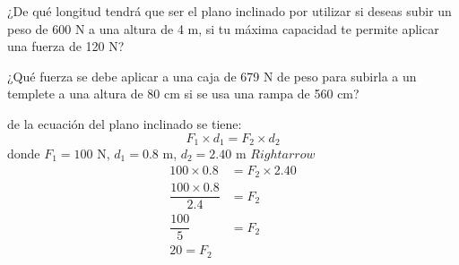 \begin{parts}
    ¿De qué longitud tendrá que ser el plano inclinado por utilizar si deseas
    subir un peso de 600 N a una altura de 4 m, si tu máxima capacidad te permite
    aplicar una fuerza de 120 N?

    \begin{solutionbox}{5cm}
    \end{solutionbox}




    ¿Qué fuerza se debe aplicar a una caja de 679 N de peso para subirla a
    un templete a una altura de 80 cm si se usa una rampa de 560 cm?
    \begin{solutionbox}{5cm}
        de la ecuación del plano inclinado se tiene:
        \[F_1 \times d_1= F_2 \times d_2\]
        donde $F_1=100$ N, $d_1=0.8$ m, $d_2=2.40$ m
        $Rightarrow$
        \[
            \begin{array}{lr}
                100 \times 0.8              & =                F_2 \times 2.40 \\
                \dfrac{100 \times 0.8}{2.4} & =  F_2                           \\
                \dfrac{100}{5}              & =               F_2              \\
                20 = F_2
            \end{array}
        \]
    \end{solutionbox}



\end{parts}